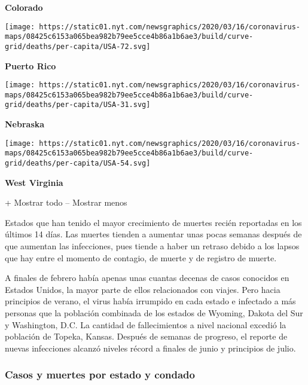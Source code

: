 \textbf{Colorado}

\href{https://www.nytimes.com/interactive/2020/us/puerto-rico-coronavirus-cases.html}{}

\texttt{[image: https://static01.nyt.com/newsgraphics/2020/03/16/coronavirus-maps/08425c6153a065bea982b79ee5cce4b86a1b6ae3/build/curve-grid/deaths/per-capita/USA-72.svg]}

\textbf{Puerto Rico}

\href{https://www.nytimes.com/interactive/2020/us/nebraska-coronavirus-cases.html}{}

\texttt{[image: https://static01.nyt.com/newsgraphics/2020/03/16/coronavirus-maps/08425c6153a065bea982b79ee5cce4b86a1b6ae3/build/curve-grid/deaths/per-capita/USA-31.svg]}

\textbf{Nebraska}

\href{https://www.nytimes.com/interactive/2020/us/west-virginia-coronavirus-cases.html}{}

\texttt{[image: https://static01.nyt.com/newsgraphics/2020/03/16/coronavirus-maps/08425c6153a065bea982b79ee5cce4b86a1b6ae3/build/curve-grid/deaths/per-capita/USA-54.svg]}

\textbf{West Virginia}

+ Mostrar todo -- Mostrar menos

Estados que han tenido el mayor crecimiento de muertes recién reportadas
en los últimos 14 días. Las muertes tienden a aumentar unas pocas
semanas después de que aumentan las infecciones, pues tiende a haber un
retraso debido a los lapsos que hay entre el momento de contagio, de
muerte y de registro de muerte.

A finales de febrero había apenas unas cuantas decenas de casos
conocidos en Estados Unidos, la mayor parte de ellos relacionados con
viajes. Pero hacia principios de verano, el virus había irrumpido en
cada estado e infectado a más personas que la población combinada de los
estados de Wyoming, Dakota del Sur y Washington, D.C. La cantidad de
fallecimientos a nivel nacional excedió la población de Topeka, Kansas.
Después de semanas de progreso, el reporte de nuevas infecciones alcanzó
niveles récord a finales de junio y principios de julio.

\hypertarget{casos-y-muertes-por-estado-y-condado}{%
\subsubsection{Casos y muertes por estado y
condado}\label{casos-y-muertes-por-estado-y-condado}}

